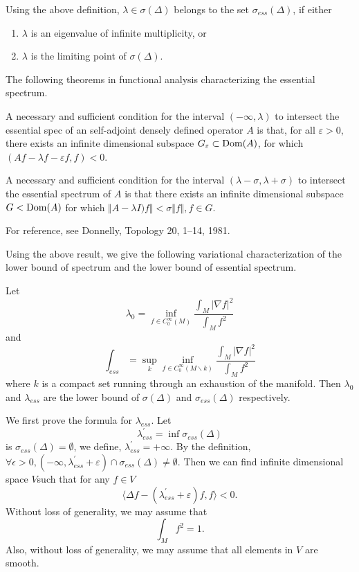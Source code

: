 Using the above definition, $ \lambda \in \sigma (\Delta ) $ belongs to the set $ \sigma _{ess} ( \Delta ) $, if either 
\begin{enumerate}
  \item $\lambda $ is an eigenvalue of infinite multiplicity, or 
  \item $ \lambda $ is the limiting point of $ \sigma (\Delta ) .$ \end{enumerate}  


The following theorems in functional analysis characterizing the essential spectrum.

\begin{theorem} A necessary and sufficient condition for the interval $ ( - \infty , \lambda ) $ to intersect the essential spec of an self-adjoint densely defined operator $A$ is that, for all $ \varepsilon > 0 $,  there exists an infinite dimensional subspace $ G _\varepsilon \subset {\rm Dom} (A) $, for which $ ( A f - \lambda f - \varepsilon f, f) < 0 $. 
\end{theorem} 

\begin{theorem}
A necessary and sufficient condition for the interval $ ( \lambda - \sigma , \lambda + \sigma ) $ to intersect the essential spectrum of $A$ is that there exists an infinite dimensional subspace $ G < {\rm Dom} (A) $ for which $ \Vert A - \lambda I) f \Vert < \sigma\Vert f\Vert, f \in G$.
\end{theorem}

For reference, see Donnelly, Topology 20, 1--14, 1981. 

Using the above result, we give the following variational characterization of the lower bound of spectrum and the lower bound of essential spectrum.

\begin{theorem}Let 
%
\[ \lambda_0 = \inf_{f \in C^\infty_0 (M)} \frac{\int_M |\nabla f| ^2}{\int_M f ^2}\]
and
\[ \int_{ess} =  \sup_k \inf_{f \in C^\infty_0 (M\backslash k)} \frac{\int_M |\nabla f| ^2}{\int_M f ^2}\]
%
where $k$ is a compact set running through an exhaustion of the manifold. Then $ \lambda _0 $ and $ \lambda_{ess} $ are the lower bound of $ \sigma (\Delta )$ and $ \sigma _{ess} ( \Delta )$ respectively.
\end{theorem}

 We first prove the formula for $ \lambda _{ess} $. Let
%
\[ \lambda _{ess} ^\prime = \inf \sigma_{ess} ( \Delta ) \]
%
is $ \sigma _{ess} (\Delta ) = \emptyset$, we define,  $ \lambda _{ess} ^\prime  = + \infty$. By the definition, $ \forall \epsilon > 0 , ( - \infty, \lambda ^\prime _{ess} + \varepsilon ) \cap \sigma _{ess} (\Delta ) \neq \emptyset$.
Then we can find infinite dimensional space $V$such that for any $ f \in V  $
%
\begin{equation} \langle \Delta f - ( \lambda _{ess} ^\prime + \varepsilon ) f , f\rangle <0. \tag{$\star$}\end{equation}
Without loss of generality, we may assume that 
%
\[ \int_M f ^2 = 1 .\]
%
Also, without loss of generality, we may assume that all elements in $V$ are smooth.

